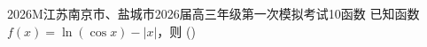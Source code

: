 
\begin{problem}{2026}{M}{江苏南京市、盐城市2026届高三年级第一次模拟考试}{10}{函数}
已知函数 $f(x)=\ln(\cos x)-|x|$，则
(\hspace{1cm})
\begin{choices}
\end{choices}
\end{problem}